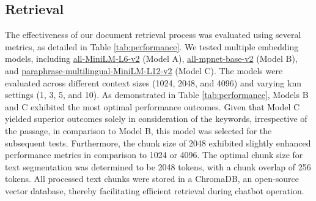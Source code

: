 \documentclass[conference]{IEEEtran}
\begin{document}
\subsection{Retrieval}
\label{subsec:results_retrieval}
The effectiveness of our document retrieval process was evaluated using several metrics, as detailed in Table \ref{tab:performance}. We tested multiple embedding models, including \href{https://huggingface.co/sentence-transformers/all-MiniLM-L6-v2}{all-MiniLM-L6-v2} (Model A), \href{https://huggingface.co/sentence-transformers/all-mpnet-base-v2}{all-mpnet-base-v2} (Model B), and \href{https://huggingface.co/sentence-transformers/paraphrase-multilingual-MiniLM-L12-v2}{paraphrase-multilingual-MiniLM-L12-v2} (Model C). The models were evaluated across different context sizes (1024, 2048, and 4096) and varying \acrshort{knn} settings (1, 3, 5, and 10). As demonstrated in Table \ref{tab:performance}, Models B and C exhibited the most optimal performance outcomes. Given that Model C yielded superior outcomes solely in consideration of the keywords, irrespective of the passage, in comparison to Model B, this model was selected for the subsequent tests. Furthermore, the chunk size of 2048 exhibited slightly enhanced performance metrics in comparison to 1024 or 4096.
The optimal chunk size for text segmentation was determined to be 2048 tokens, with a chunk overlap of 256 tokens. All processed text chunks were stored in a ChromaDB, an open-source vector database, thereby facilitating efficient retrieval during chatbot operation.
\end{document}
